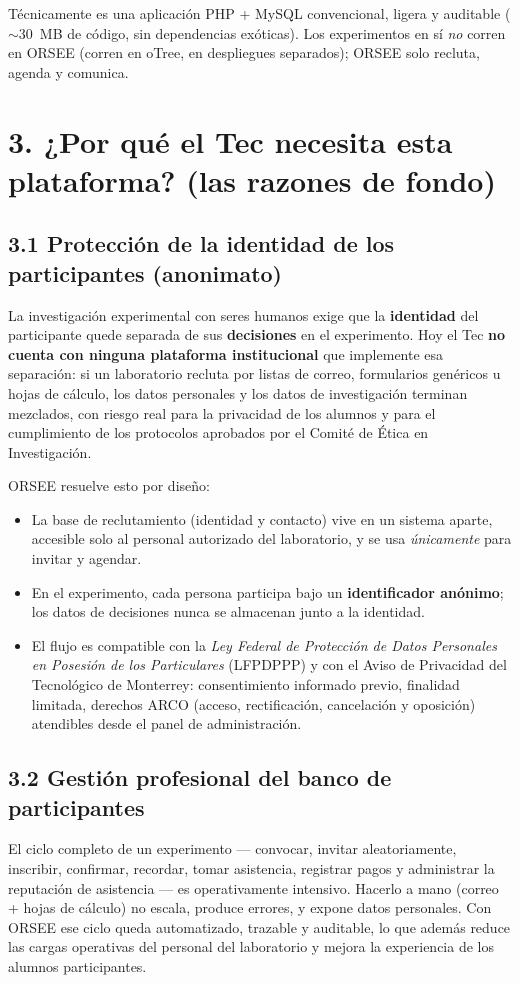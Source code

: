 \documentclass[11pt,letterpaper]{article}
\newcommand{\seccion}[1]{\section*{\color{tecblue}#1}}
\newcommand{\subseccion}[1]{\subsection*{#1}}
\begin{document}
Técnicamente es una aplicación PHP + MySQL convencional, ligera y auditable
($\sim$30~MB de código, sin dependencias exóticas). Los experimentos en sí \emph{no} corren
en ORSEE (corren en oTree, en despliegues separados); ORSEE solo recluta, agenda y
comunica.

\seccion{3. ¿Por qué el Tec necesita esta plataforma? (las razones de fondo)}

\subseccion{3.1 Protección de la identidad de los participantes (anonimato)}

La investigación experimental con seres humanos exige que la \textbf{identidad} del
participante quede separada de sus \textbf{decisiones} en el experimento. Hoy el Tec
\textbf{no cuenta con ninguna plataforma institucional} que implemente esa separación: si un
laboratorio recluta por listas de correo, formularios genéricos u hojas de cálculo, los
datos personales y los datos de investigación terminan mezclados, con riesgo real para la
privacidad de los alumnos y para el cumplimiento de los protocolos aprobados por el
Comité de Ética en Investigación.

ORSEE resuelve esto por diseño:

\begin{itemize}[leftmargin=2em]
    \item La base de reclutamiento (identidad y contacto) vive en un sistema aparte,
    accesible solo al personal autorizado del laboratorio, y se usa \emph{únicamente} para
    invitar y agendar.
    \item En el experimento, cada persona participa bajo un \textbf{identificador anónimo};
    los datos de decisiones nunca se almacenan junto a la identidad.
    \item El flujo es compatible con la \emph{Ley Federal de Protección de Datos Personales en
    Posesión de los Particulares} (LFPDPPP) y con el Aviso de Privacidad del Tecnológico
    de Monterrey: consentimiento informado previo, finalidad limitada, derechos ARCO
    (acceso, rectificación, cancelación y oposición) atendibles desde el panel de
    administración.
\end{itemize}

\subseccion{3.2 Gestión profesional del banco de participantes}

El ciclo completo de un experimento --- convocar, invitar aleatoriamente, inscribir,
confirmar, recordar, tomar asistencia, registrar pagos y administrar la reputación de
asistencia --- es operativamente intensivo. Hacerlo a mano (correo + hojas de cálculo) no
escala, produce errores, y expone datos personales. Con ORSEE ese ciclo queda
automatizado, trazable y auditable, lo que además reduce las cargas operativas del
personal del laboratorio y mejora la experiencia de los alumnos participantes.
\end{document}
